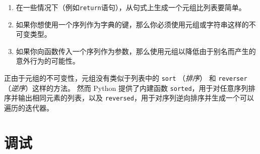 \begin{enumerate}

\item 在一些情况下（例如\lstinline{return}语句），从句式上生成一个元组比列表要简单。

\item 如果你想使用一个序列作为字典的键，那么你必须使用元组或字符串这样的不可变类型。

\item 如果你向函数传入一个序列作为参数，那么使用元组以降低由于别名而产生的意外行为的可能性。

\end{enumerate}


正由于元组的不可变性，元组没有类似于列表中的 \lstinline{sort} （\emph{排序}） 和 \lstinline{reverser} （\emph{逆序}）这样的方法。  然而 Python 提供了内建函数 \lstinline{sorted}，用于对任意序列排序并输出相同元素的列表，以及 \lstinline {reversed}，用于对序列逆向排序并生成一个可以遍历的迭代器。

  
 


\section{调试}
 
 



